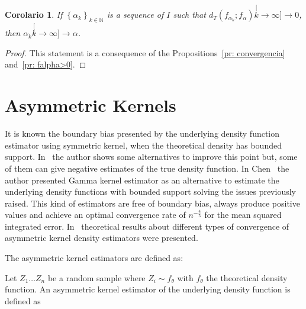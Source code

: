 \documentclass[journal]{IEEEtran}
\numberwithin{equation}{section}
\newtheorem{corollary}{Corolario}[section]
\newenvironment{dem}[1][Proof]{\begin{proof}[{\it #1}]}{\end{proof}}
\newcommand{\N}{\ensuremath{\mathbb{N}}}
\newcommand{\pa}[1]{\ensuremath{\left( #1 \right)}}
\newcommand{\set}[1]{\ensuremath{\left\{ #1 \right\}}}
\begin{document}
\vspace{0.2cm}

\begin{corollary}
	If $\set{\alpha_{k}}_{k\in\N}$ is a sequence of $I$ such that $d_{T}\pa{f_{\alpha_{k}};f_{\alpha}}\stackrel[k\to\infty]{}{\longrightarrow}  0$,
	then $\alpha_{k}\stackrel[k\to\infty]{}{\longrightarrow} \alpha$.
	\label{corfinal}
\end{corollary}
\begin{dem}
	This statement is a consequence of the Propositions~\ref{pr: convergencia} and~\ref{pr: falpha>0}.
\end{dem}


\section{Asymmetric Kernels}
\label{AK}

It is known the boundary bias presented by the underlying density function estimator using symmetric kernel, when the theoretical density has bounded support. In~\cite{Jones1993} the author shows some alternatives to improve this point but, some of them can give negative estimates of the true density function. In Chen~\cite{chensx2000} the author presented Gamma kernel estimator as an alternative to estimate the underlying density functions with bounded support solving the issues previously raised. This kind of estimators are free of boundary bias, always produce positive values and achieve an optimal convergence rate of $n^{-\frac{4}{5}}$ for the mean squared integrated error. In~\cite{bouezmarni2005} theoretical results about different types of convergence of asymmetric kernel density estimators were presented. 

The asymmetric kernel estimators are defined as:


Let $Z_1 \ldots Z_n$ be a random sample where $Z_i \sim f_{\theta}$ with $f_{\theta}$ the theoretical density function. An asymmetric kernel estimator of the underlying density function is defined as 
\end{document}
